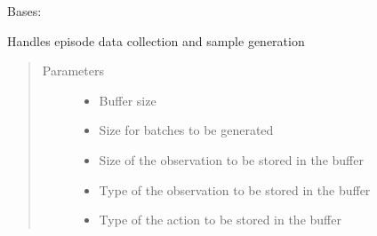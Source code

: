 \documentclass[letterpaper,10pt,english]{sphinxmanual}
\begin{document}
\begin{fulllineitems}
\label{\detokenize{agents.reinforcement_learning:agents.reinforcement_learning.dqn.MemoryBuffer}}
\sphinxAtStartPar
Bases: 

\sphinxAtStartPar
Handles episode data collection and sample generation
\begin{quote}\begin{description}
\item[{Parameters}] \leavevmode\begin{itemize}
\item {} 
\sphinxAtStartPar
{} \textendash{} Buffer size

\item {} 
\sphinxAtStartPar
{} \textendash{} Size for batches to be generated

\item {} 
\sphinxAtStartPar
{} \textendash{} Size of the observation to be stored in the buffer

\item {} 
\sphinxAtStartPar
{} \textendash{} Type of the observation to be stored in the buffer

\item {} 
\sphinxAtStartPar
{} \textendash{} Type of the action to be stored in the buffer

\end{itemize}

\end{description}\end{quote}


\end{fulllineitems}
\end{document}
